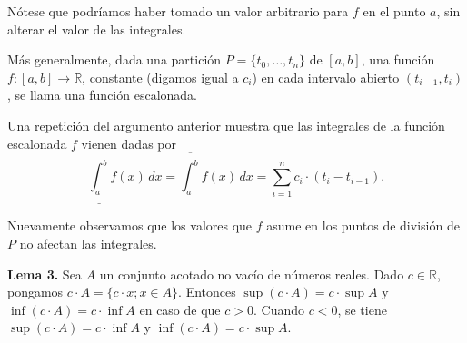\documentclass[12pt,oneside]{book}
\begin{document}
\begin{center}
\end{center}

Nótese que podríamos haber tomado un valor arbitrario para \(f\) en el punto \(a\), sin alterar el valor de las integrales.

Más generalmente, dada una partición \(P = \{t_0, \ldots, t_n\}\) de \([a,b]\), una función \(f: [a,b] \to \mathbb{R}\), constante (digamos igual a \(c_i\)) en cada intervalo abierto \((t_{i-1}, t_i)\), se llama una función escalonada.

Una repetición del argumento anterior muestra que las integrales de la función escalonada \(f\) vienen dadas por
\[
\underline{\int_{a}^{b}} f(x) \, dx = \overline{\int_{a}^{b}} f(x) \, dx = \sum_{i=1}^{n} c_i \cdot (t_i - t_{i-1}).
\]

Nuevamente observamos que los valores que \(f\) asume en los puntos de división de \(P\) no afectan las integrales.

\textbf{Lema 3.} Sea \(A\) un conjunto acotado no vacío de números reales. Dado \(c \in \mathbb{R}\), pongamos \(c \cdot A = \{c \cdot x; x \in A\}\). Entonces \(\sup(c \cdot A) = c \cdot \sup A\) y \(\inf(c \cdot A) = c \cdot \inf A\) en caso de que \(c > 0\). Cuando \(c < 0\), se tiene \(\sup(c \cdot A) = c \cdot \inf A\) y \(\inf(c \cdot A) = c \cdot \sup A\).
\end{document}
